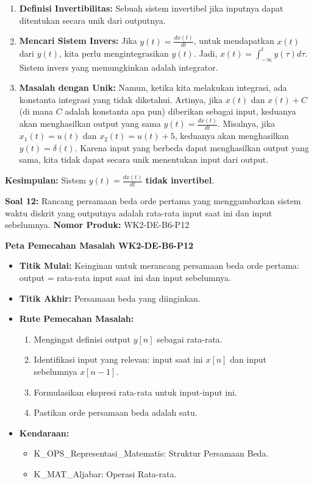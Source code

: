 \documentclass[
  letterpaper,
  DIV=11,
  numbers=noendperiod]{scrreprt}
\providecommand{\tightlist}{%
  \setlength{\itemsep}{0pt}\setlength{\parskip}{0pt}}
\begin{document}
\begin{enumerate}
\def\labelenumi{\arabic{enumi}.}
\tightlist
\item
  \textbf{Definisi Invertibilitas:} Sebuah sistem invertibel jika
  inputnya dapat ditentukan secara unik dari outputnya.
\item
  \textbf{Mencari Sistem Invers:} Jika \(y(t) = \frac{dx(t)}{dt}\),
  untuk mendapatkan \(x(t)\) dari \(y(t)\), kita perlu mengintegrasikan
  \(y(t)\). Jadi, \(x(t) = \int_{-\infty}^{t} y(\tau) d\tau\). Sistem
  invers yang memungkinkan adalah integrator.
\item
  \textbf{Masalah dengan Unik:} Namun, ketika kita melakukan integrasi,
  ada konstanta integrasi yang tidak diketahui. Artinya, jika \(x(t)\)
  dan \(x(t) + C\) (di mana \(C\) adalah konstanta apa pun) diberikan
  sebagai input, keduanya akan menghasilkan output yang sama
  \(y(t) = \frac{dx(t)}{dt}\). Misalnya, jika \(x_1(t) = u(t)\) dan
  \(x_2(t) = u(t) + 5\), keduanya akan menghasilkan
  \(y(t) = \delta(t)\). Karena input yang berbeda dapat menghasilkan
  output yang sama, kita tidak dapat secara unik menentukan input dari
  output.
\end{enumerate}

\textbf{Kesimpulan:} Sistem \(y(t) = \frac{dx(t)}{dt}\) \textbf{tidak
invertibel}.

\textbf{Soal 12:} Rancang persamaan beda orde pertama yang menggambarkan
sistem waktu diskrit yang outputnya adalah rata-rata input saat ini dan
input sebelumnya. \textbf{Nomor Produk:} WK2-DE-B6-P12

\textbf{Peta Pemecahan Masalah WK2-DE-B6-P12}

\begin{itemize}
\tightlist
\item
  \textbf{Titik Mulai:} Keinginan untuk merancang persamaan beda orde
  pertama: output = rata-rata input saat ini dan input sebelumnya.
\item
  \textbf{Titik Akhir:} Persamaan beda yang diinginkan.
\item
  \textbf{Rute Pemecahan Masalah:}

  \begin{enumerate}
  \def\labelenumi{\arabic{enumi}.}
  \tightlist
  \item
    Mengingat definisi output \(y[n]\) sebagai rata-rata.
  \item
    Identifikasi input yang relevan: input saat ini \(x[n]\) dan input
    sebelumnya \(x[n-1]\).
  \item
    Formulasikan ekspresi rata-rata untuk input-input ini.
  \item
    Pastikan orde persamaan beda adalah satu.
  \end{enumerate}
\item
  \textbf{Kendaraan:}

  \begin{itemize}
  \tightlist
  \item
    K\_OPS\_Representasi\_Matematis: Struktur Persamaan Beda.
  \item
    K\_MAT\_Aljabar: Operasi Rata-rata.
  \end{itemize}
\end{itemize}
\end{document}
